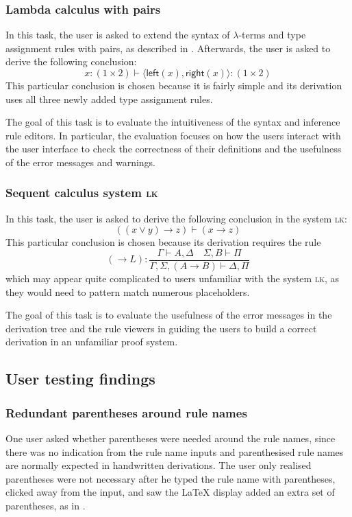 \subsubsection{Lambda calculus with pairs}
In this task, the user is asked to extend the syntax of $\lambda$-terms and type assignment rules with pairs, as described in . Afterwards, the user is asked to derive the following conclusion:
\[
    x: (1 \times 2) \vdash \langle \textsf{left}(x), \textsf{right}(x) \rangle: (1 \times 2)
\]
This particular conclusion is chosen because it is fairly simple and its derivation uses all three newly added type assignment rules.

The goal of this task is to evaluate the intuitiveness of the syntax and inference rule editors. In particular, the evaluation focuses on how the users interact with the user interface to check the correctness of their definitions and the usefulness of the error messages and warnings.

\subsubsection{Sequent calculus system \textsc{lk}}
In this task, the user is asked to derive the following conclusion in the system \textsc{lk}:
\[
    ((x \lor y) \to z) \vdash (x \to z)
\]
This particular conclusion is chosen because its derivation requires the rule
\[
    (\to L): \frac{\Gamma \vdash A, \Delta \quad \Sigma, B \vdash \Pi}{\Gamma, \Sigma, (A \rightarrow B) \vdash \Delta, \Pi}
\]
which may appear quite complicated to users unfamiliar with the system \textsc{lk}, as they would need to pattern match numerous placeholders.

The goal of this task is to evaluate the usefulness of the error messages in the derivation tree and the rule viewers in guiding the users to build a correct derivation in an unfamiliar proof system.

\subsection{User testing findings}
\subsubsection{Redundant parentheses around rule names}
One user asked whether parentheses were needed around the rule names, since there was no indication from the rule name inputs and parenthesised rule names are normally expected in handwritten derivations. The user only realised parentheses were not necessary after he typed the rule name with parentheses, clicked away from the input, and saw the \LaTeX{} display added an extra set of parentheses, as in .

